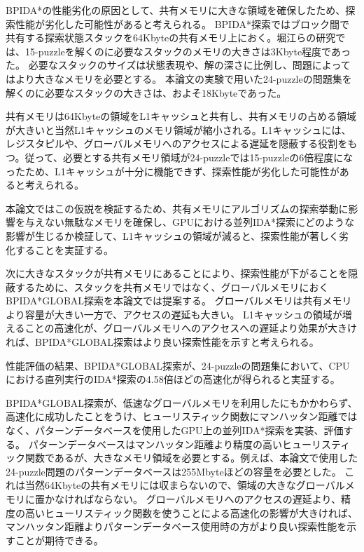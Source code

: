 \documentclass[a4paper,11pt,oneside,openany]{jsbook}
\begin{document}
BPIDA*の性能劣化の原因として、共有メモリに大きな領域を確保したため、探索性能が劣化した可能性があると考えられる。
BPIDA*探索ではブロック間で共有する探索状態スタックを64Kbyteの共有メモリ上におく。堀江らの研究では、15-puzzleを解くのに必要なスタックのメモリの大きさは3Kbyte程度であった。
必要なスタックのサイズは状態表現や、解の深さに比例し、問題によってはより大きなメモリを必要とする。
本論文の実験で用いた24-puzzleの問題集を解くのに必要なスタックの大きさは、およそ18Kbyteであった。

共有メモリは64Kbyteの領域をL1キャッシュと共有し、共有メモリの占める領域が大きいと当然L1キャッシュのメモリ領域が縮小される。L1キャッシュには、レジスタピルや、グローバルメモリへのアクセスによる遅延を隠蔽する役割をもつ。従って、必要とする共有メモリ領域が24-puzzleでは15-puzzleの6倍程度になったため、L1キャッシュが十分に機能できず、探索性能が劣化した可能性があると考えられる。

本論文ではこの仮説を検証するため、共有メモリにアルゴリズムの探索挙動に影響を与えない無駄なメモリを確保し、GPUにおける並列IDA*探索にどのような影響が生じるか検証して、L1キャッシュの領域が減ると、探索性能が著しく劣化することを実証する。

次に大きなスタックが共有メモリにあることにより、探索性能が下がることを隠蔽するために、スタックを共有メモリではなく、グローバルメモリにおくBPIDA*GLOBAL探索を本論文では提案する。
グローバルメモリは共有メモリより容量が大きい一方で、アクセスの遅延も大きい。
L1キャッシュの領域が増えることの高速化が、グローバルメモリへのアクセスへの遅延より効果が大きければ、BPIDA*GLOBAL探索はより良い探索性能を示すと考えられる。

性能評価の結果、BPIDA*GLOBAL探索が、24-puzzleの問題集において、CPUにおける直列実行のIDA*探索の4.58倍ほどの高速化が得られると実証する。

BPIDA*GLOBAL探索が、低速なグローバルメモリを利用したにもかかわらず、高速化に成功したことをうけ、ヒューリスティック関数にマンハッタン距離ではなく、パターンデータベースを使用したGPU上の並列IDA*探索を実装、評価する。
パターンデータベースはマンハッタン距離より精度の高いヒューリスティック関数であるが、大きなメモリ領域を必要とする。例えば、本論文で使用した24-puzzle問題のパターンデータベースは255Mbyteほどの容量を必要とした。
これは当然64Kbyteの共有メモリには収まらないので、領域の大きなグローバルメモリに置かなければならない。
グローバルメモリへのアクセスの遅延より、精度の高いヒューリスティック関数を使うことによる高速化の影響が大きければ、マンハッタン距離よりパターンデータベース使用時の方がより良い探索性能を示すことが期待できる。
\end{document}
